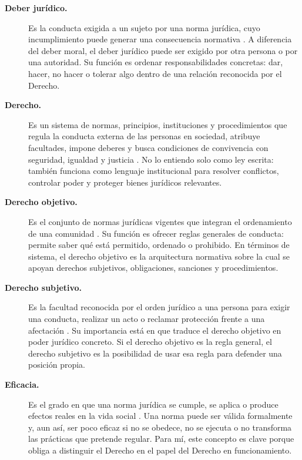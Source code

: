 \documentclass[
	spanish,
	letterpaper, oneside
]{article}
\begin{document}
\begin{description}
\item[\textbf{Deber jurídico.}]
Es la conducta exigida a un sujeto por una norma jurídica, cuyo incumplimiento puede generar una consecuencia normativa \citep{garciaMaynez2002,poderJudicialGto2007}. A diferencia del deber moral, el deber jurídico puede ser exigido por otra persona o por una autoridad. Su función es ordenar responsabilidades concretas: dar, hacer, no hacer o tolerar algo dentro de una relación reconocida por el Derecho.

\item[\textbf{Derecho.}]
Es un sistema de normas, principios, instituciones y procedimientos que regula la conducta externa de las personas en sociedad, atribuye facultades, impone deberes y busca condiciones de convivencia con seguridad, igualdad y justicia \citep{poderJudicialGto2007,rojas-gonzalezFilosofiaDerecho2018}. No lo entiendo solo como ley escrita: también funciona como lenguaje institucional para resolver conflictos, controlar poder y proteger bienes jurídicos relevantes.

\item[\textbf{Derecho objetivo.}]
Es el conjunto de normas jurídicas vigentes que integran el ordenamiento de una comunidad \citep{garciaMaynez2002,poderJudicialGto2007}. Su función es ofrecer reglas generales de conducta: permite saber qué está permitido, ordenado o prohibido. En términos de sistema, el derecho objetivo es la arquitectura normativa sobre la cual se apoyan derechos subjetivos, obligaciones, sanciones y procedimientos.

\item[\textbf{Derecho subjetivo.}]
Es la facultad reconocida por el orden jurídico a una persona para exigir una conducta, realizar un acto o reclamar protección frente a una afectación \citep{garciaMaynez2002,poderJudicialGto2007}. Su importancia está en que traduce el derecho objetivo en poder jurídico concreto. Si el derecho objetivo es la regla general, el derecho subjetivo es la posibilidad de usar esa regla para defender una posición propia.

\item[\textbf{Eficacia.}]
Es el grado en que una norma jurídica se cumple, se aplica o produce efectos reales en la vida social \citep{garciaMaynez2002,launDerechoMoral2021}. Una norma puede ser válida formalmente y, aun así, ser poco eficaz si no se obedece, no se ejecuta o no transforma las prácticas que pretende regular. Para mí, este concepto es clave porque obliga a distinguir el Derecho en el papel del Derecho en funcionamiento.


\end{description}
\end{document}
